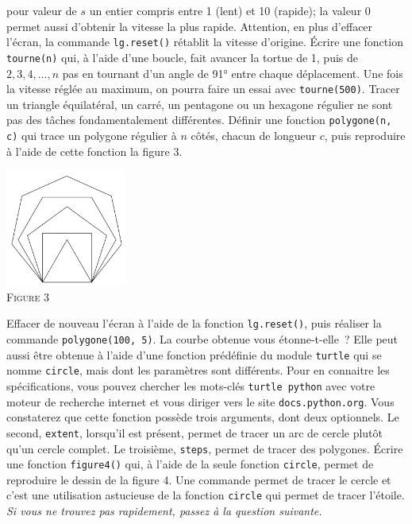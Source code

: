 \documentclass{magnolia}
\begin{document}
\begin{questions}
  pour valeur de $s$ un entier compris entre 1 (lent) et 10 (rapide); la valeur 0 permet aussi d'obtenir la vitesse la plus rapide. Attention, en
  plus d'effacer l'écran, la commande \verb!lg.reset()! rétablit la vitesse d'origine.
\question Écrire une fonction \verb!tourne(n)! qui, à l'aide d'une boucle, fait avancer la tortue de 1, puis de $2, 3, 4, \ldots, n$ pas en
  tournant d'un angle de \ang{91} entre chaque déplacement. Une fois
  la vitesse réglée au maximum, on pourra faire un essai avec
  \verb!tourne(500)!.
\question Tracer un triangle équilatéral, un carré, un pentagone ou un hexagone régulier ne sont
  pas des tâches fondamentalement différentes. Définir une fonction \verb!polygone(n, c)! qui
  trace un polygone régulier à $n$ côtés, chacun de longueur $c$, puis reproduire à l'aide de cette
  fonction la figure 3.
\begin{center}
\includegraphics[width=0.3\textwidth]{../../Commun/Images/python-tp-logo-3}\\
\textsc{Figure 3}
\end{center}
\enonce Effacer de nouveau l'écran à l'aide de la fonction \verb!lg.reset()!, puis réaliser la commande
  \verb!polygone(100, 5)!. La courbe obtenue vous étonne-t-elle~? Elle peut aussi être obtenue à l'aide
  d'une fonction prédéfinie du module \verb!turtle! qui se nomme \verb!circle!, mais dont les
  paramètres sont différents. Pour en connaitre les spécifications, vous pouvez chercher les mots-clés
  \verb!turtle python! avec votre moteur de recherche internet et vous diriger vers le site \verb!docs.python.org!.
  Vous constaterez que cette fonction possède trois arguments, dont deux optionnels. Le second, \verb!extent!,
  lorsqu'il est présent, permet de tracer un arc de cercle plutôt qu'un cercle complet. Le troisième,
  \verb!steps!, permet de tracer des polygones.
\question Écrire une fonction \verb!figure4()! qui, à l'aide de la seule fonction \verb!circle!, permet de reproduire le dessin de la figure 4. Une commande
  permet de tracer le cercle et c'est une utilisation astucieuse de la
  fonction \verb!circle! qui permet de tracer l'étoile.
  \emph{Si vous ne trouvez pas rapidement, passez à la question suivante.}

\end{questions}
\end{document}

